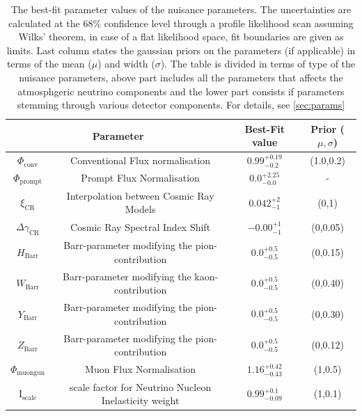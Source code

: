 \begin{table}[h]
    \caption{The best-fit parameter values of the nuisance parameters. The uncertainties are calculated at the 68\% confidence level through a profile likelihood scan assuming Wilks' theorem, in case of a flat likelihood space, fit boundaries are given as limits. Last column states the gaussian priors on the parameters (if applicable) in terms of the mean ($\mu$) and width ($\sigma$). The table is divided in terms of type of the nuisance parameters, above part includes all the parameters that affects the atmosphgeric neutrino components and the lower part consists if parameters stemming through various detector components. For details, see \ref{sec:params}}
    {\renewcommand{\arraystretch}{1.4}
    \begin{tabular}{ c c |c|c}
        \hline
        \multicolumn{2}{c|}{Parameter}  & Best-Fit value & Prior ($\mu,\sigma$)\\
        \hline
        \hline
        $\Phi_{\mathrm{conv}}$& Conventional Flux normalisation & $0.99_{-0.2}^{+0.19}$ & (1.0,0.2)\\
        \hline
        $\Phi_{\mathrm{prompt}}$& Prompt Flux Normalisation & ${0.0}_{-0.0}^{+2.25}$ & - \\
        \hline
        $\xi_{\mathrm{CR}}$& Interpolation between Cosmic Ray Models & $0.042_{-1}^{+2}$ & (0,1)\\
        \hline
        $\Delta\gamma_{\mathrm{CR}}$& Cosmic Ray Spectral Index Shift & $-0.00_{-1}^{+1}$ & (0,0.05)\\
        \hline
        $H_{\mathrm{Barr}}$& Barr-parameter modifying the pion-contribution & $0.0_{-0.5}^{+0.5}$ & (0,0.15)\\
        \hline
        $W_{\mathrm{Barr}}$& Barr-parameter modifying the kaon-contribution & $0.0_{-0.5}^{+0.5}$ & (0,0.40)\\
        \hline
        $Y_{\mathrm{Barr}}$& Barr-parameter modifying the pion-contribution & $0.0_{-0.5}^{+0.5}$ & (0,0.30)\\
        \hline
        $Z_{\mathrm{Barr}}$& Barr-parameter modifying the pion-contribution & $0.0_{-0.5}^{+0.5}$ & (0,0.12)\\
        \hline
        $\Phi_{\mathrm{muongun}}$ & Muon Flux Normalisation & $1.16_{-0.43}^{+0.42}$ & (1,0.5)\\
        \hline
        $\mathrm{I}_{\mathrm{scale}}$ & scale factor for Neutrino Nucleon Inelasticity weight & $0.99_{-0.09}^{+0.1}$ & (1,0.1)\\
        \hline
        

\end{tabular}}
\end{table}
